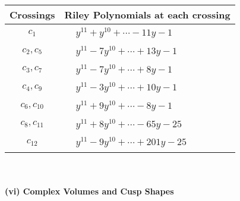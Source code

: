 \documentclass[1p]{elsarticle_modified}
\theoremstyle{definition}
\begin{document}
\begin{tabular}{m{50pt}|m{274pt}}
Crossings & \hspace{64pt}Riley Polynomials at each crossing \\
\hline $$\begin{aligned}c_{1}\end{aligned}$$&$\begin{aligned}
&y^{11}+y^{10}+\cdots-11 y-1
\end{aligned}$\\
\hline $$\begin{aligned}c_{2},c_{5}\end{aligned}$$&$\begin{aligned}
&y^{11}-7 y^{10}+\cdots+13 y-1
\end{aligned}$\\
\hline $$\begin{aligned}c_{3},c_{7}\end{aligned}$$&$\begin{aligned}
&y^{11}-7 y^{10}+\cdots+8 y-1
\end{aligned}$\\
\hline $$\begin{aligned}c_{4},c_{9}\end{aligned}$$&$\begin{aligned}
&y^{11}-3 y^{10}+\cdots+10 y-1
\end{aligned}$\\
\hline $$\begin{aligned}c_{6},c_{10}\end{aligned}$$&$\begin{aligned}
&y^{11}+9 y^{10}+\cdots-8 y-1
\end{aligned}$\\
\hline $$\begin{aligned}c_{8},c_{11}\end{aligned}$$&$\begin{aligned}
&y^{11}+8 y^{10}+\cdots-65 y-25
\end{aligned}$\\
\hline $$\begin{aligned}c_{12}\end{aligned}$$&$\begin{aligned}
&y^{11}-9 y^{10}+\cdots+201 y-25
\end{aligned}$\\
\hline
\end{tabular}\\~\\
\newpage\flushleft \textbf{(vi) Complex Volumes and Cusp Shapes}
\end{document}
